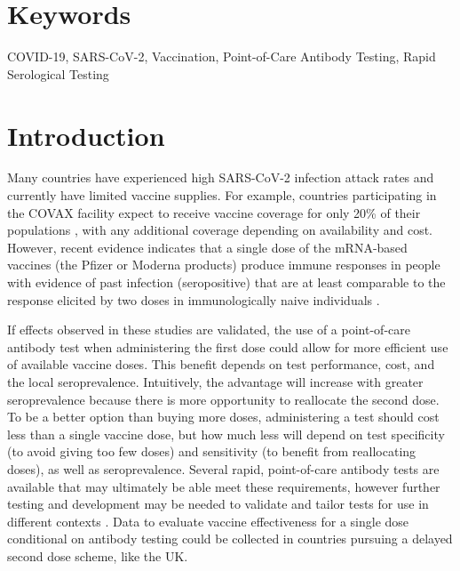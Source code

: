 \documentclass[10pt,a4paper,twocolumn]{article}
\begin{document}
\section*{Keywords}

COVID-19, SARS-CoV-2, Vaccination, Point-of-Care Antibody Testing, Rapid Serological Testing

\clearpage


\section*{Introduction}

Many countries have experienced high SARS-CoV-2 infection attack rates and currently have limited vaccine supplies. For example, countries participating in the COVAX facility expect to receive vaccine coverage for only 20\% of their populations \cite{noauthor_gavi_nodate}, with any additional coverage depending on availability and cost. However, recent evidence indicates that a single dose of the mRNA-based vaccines (\eg* the Pfizer or Moderna products) produce immune responses in people with evidence of past infection (\ie* seropositive) that are at least comparable to the response elicited by two doses in immunologically naive individuals \cite{krammer_antibody_2021,stamatatos_mrna_2021,samanovic_poor_2021,saadat_binding_2021,lustig_neutralizing_2021}.

If effects observed in these studies are validated, the use of a point-of-care antibody test when administering the first dose could allow for more efficient use of available vaccine doses. This benefit depends on test performance, cost, and the local seroprevalence. Intuitively, the advantage will increase with greater seroprevalence because there is more opportunity to reallocate the second dose. To be a better option than buying more doses, administering a test should cost less than a single vaccine dose, but how much less will depend on test specificity (to avoid giving too few doses) and sensitivity (to benefit from reallocating doses), as well as seroprevalence. Several rapid, point-of-care antibody tests \cite{baraniuk_covid-19_2020,mathur_antibody_2020,shuren_fdas_2021,prazuck_evaluation_2021} are available that may ultimately be able meet these requirements, however further testing and development may be needed to validate and tailor tests for use in different contexts \cite{ndaye_challenges_2021,tso_high_2021,emmerich_limited_2021}. Data to evaluate vaccine effectiveness for a single dose conditional on antibody testing could be collected in countries pursuing a delayed second dose scheme, like the UK.
\end{document}
